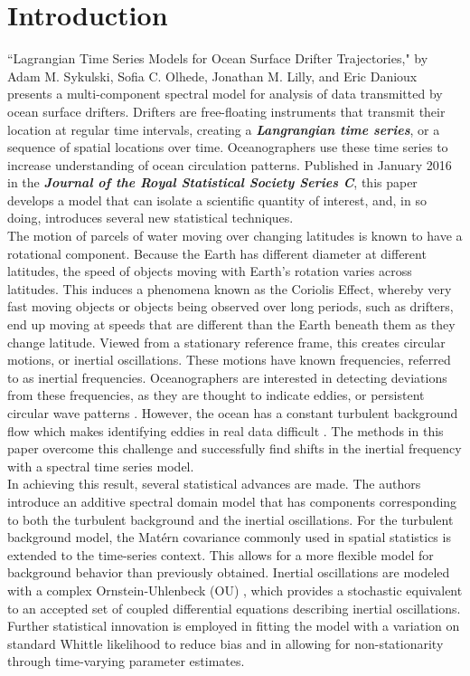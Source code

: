 \documentclass{stat572Style}
\begin{document}
\section{Introduction}
\indent ``Lagrangian Time Series Models for Ocean Surface Drifter Trajectories," by Adam M. Sykulski, Sofia C. Olhede, Jonathan M. Lilly, and Eric Danioux presents a multi-component spectral model for analysis of data transmitted by ocean surface drifters. Drifters are free-floating  instruments that transmit their location at regular time intervals,  creating a \textbf{\it{Langrangian time series}}, or a sequence of spatial locations over time. Oceanographers use these time series to increase understanding of  ocean circulation patterns. Published in January 2016 in the \textbf{\it{Journal of the Royal Statistical Society Series C}}, this paper develops a model that can isolate a scientific quantity of interest,  and, in so doing, introduces several new statistical techniques.\\
\indent The motion of parcels of water moving over changing latitudes is known to have a rotational component. Because the Earth has  different diameter at different latitudes, the speed of objects moving with Earth's rotation varies across latitudes.  This induces a phenomena known as the Coriolis Effect, whereby very fast moving objects or objects being observed over long periods, such as drifters, end up moving at speeds that are different than the Earth beneath them as they change latitude. Viewed from a stationary reference frame, this creates circular motions, or inertial oscillations. These motions have known frequencies, referred to as inertial frequencies. Oceanographers  are interested in detecting deviations from these frequencies, as they are thought to indicate eddies, or persistent circular wave patterns \citep{Kunze1985}. However, the ocean has a constant turbulent background flow which makes identifying eddies in real data difficult \citep{ Elipot2010}. The methods in this paper overcome this challenge and successfully find shifts in the inertial frequency with a spectral time series model. \\
\indent In achieving this result, several statistical advances are made.  The authors introduce an additive spectral domain model that has components corresponding to both the turbulent background and the inertial oscillations. For the turbulent background model, the Mat\'{e}rn covariance commonly used in spatial statistics \citep{Gneiting2012} is extended to the time-series context. This allows for a more flexible model for background behavior than previously obtained.  Inertial oscillations are modeled with a complex Ornstein-Uhlenbeck (OU) \citep{Arato1962, Jeffreys1968}, which provides a stochastic equivalent to an accepted set of coupled differential equations describing inertial oscillations. Further statistical innovation is employed in fitting the model with a variation on standard Whittle likelihood to reduce bias and in allowing for non-stationarity through time-varying parameter estimates. \\
\end{document}
